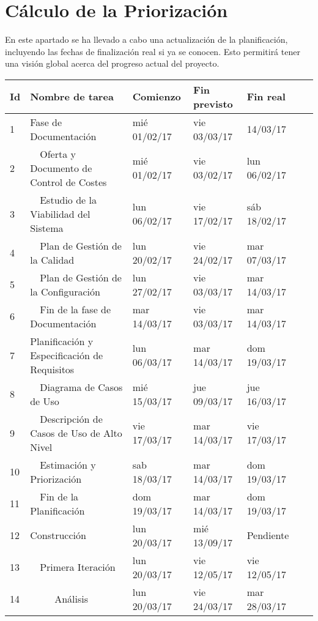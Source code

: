 \section{Cálculo de la Priorización}

 \par En este apartado se ha llevado a cabo una actualización de la planificación, incluyendo las fechas de finalización real si ya se conocen. Esto permitirá tener una visión global acerca del progreso actual del proyecto.

 \begin{center}
 \begin{longtable}{ l l l l l l}
	Id & Nombre de tarea & Comienzo & Fin previsto & Fin real & \  \\ \hline
	1 & Fase de Documentación & mié 01/02/17 & vie 03/03/17 & 14/03/17 & \  \\ \hline
	2 &   Oferta y Documento de Control de Costes & mié 01/02/17 & vie 03/02/17 & lun 06/02/17 &  \\ \hline
	3 &   Estudio de la Viabilidad del Sistema & lun 06/02/17 & vie 17/02/17 & sáb 18/02/17 & \  \\ \hline
	4 &   Plan de Gestión de la Calidad & lun 20/02/17 & vie 24/02/17 & mar 07/03/17 & \  \\ \hline
	5 &   Plan de Gestión de la Configuración & lun 27/02/17 & vie 03/03/17 & mar 14/03/17 & \  \\ \hline
	6 &   Fin de la fase de Documentación & mar 14/03/17 & vie 03/03/17 & mar 14/03/17 & \  \\ \hline
	7 & Planificación y Especificación de Requisitos & lun 06/03/17 & mar 14/03/17 & dom 19/03/17 & \  \\ \hline
	8 &   Diagrama de Casos de Uso & mié 15/03/17 & jue 09/03/17 & jue 16/03/17 & \  \\ \hline
	9 &   Descripción de Casos de Uso de Alto Nivel & vie 17/03/17 & mar 14/03/17 & vie 17/03/17 & \  \\ \hline
	10 &   Estimación y Priorización & sab 18/03/17 & mar 14/03/17 & dom 19/03/17 & \  \\ \hline
	11 &   Fin de la Planificación & dom 19/03/17 & mar 14/03/17 & dom 19/03/17 & \  \\ \hline
	12 & Construcción & lun 20/03/17 & mié 13/09/17 & Pendiente & \  \\ \hline
	13 &   Primera Iteración & lun 20/03/17 & vie 12/05/17 & vie 12/05/17 & \  \\ \hline
	14 &      Análisis & lun 20/03/17 & vie 24/03/17 & mar 28/03/17 & \  \\ \hline

\end{longtable}
\end{center}
